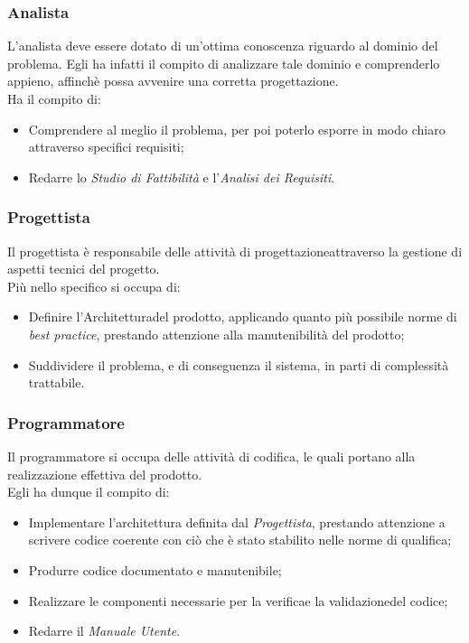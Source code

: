 \subsubsection{Analista}
	L'analista deve essere dotato di un'ottima conoscenza riguardo al dominio del problema. Egli ha infatti il 					compito di analizzare tale dominio e comprenderlo appieno, affinchè possa avvenire una corretta 											progettazione\glossario.\\
	Ha il compito di:
	\begin{itemize}
	\item Comprendere al meglio il problema, per poi poterlo esporre in modo chiaro attraverso specifici 									requisiti\glossario;
	\item Redarre lo \textit{Studio di Fattibilità} e l'\textit{Analisi dei Requisiti}\glossario.
	\end{itemize}

\subsubsection{Progettista}
	Il progettista è responsabile delle attività di progettazione\glossario attraverso la gestione di aspetti tecnici 	del progetto\glossario.\\
	Più nello specifico si occupa di:
	\begin{itemize}
	\item Definire l'Architettura\glossario del prodotto\glossario, applicando quanto più possibile norme di 							\textit{best practice}\glossario, prestando attenzione alla manutenibilità del prodotto\glossario;
	\item Suddividere il problema, e di conseguenza il sistema, in parti di complessità trattabile.
	\end{itemize}

\subsubsection{Programmatore}
	Il programmatore si occupa delle attività di codifica, le quali portano alla realizzazione effettiva del 						prodotto\glossario.\\
	Egli ha dunque il compito di:
	\begin{itemize}
	\item Implementare l'architettura definita dal \textit{Progettista}, prestando attenzione a scrivere codice 						coerente con ciò che è stato stabilito nelle norme di qualifica;
	\item Produrre codice documentato e manutenibile;
	\item Realizzare le componenti necessarie per la verifica\glossario e la validazione\glossario del codice;
	\item Redarre il \textit{Manuale Utente}.
	\end{itemize}

